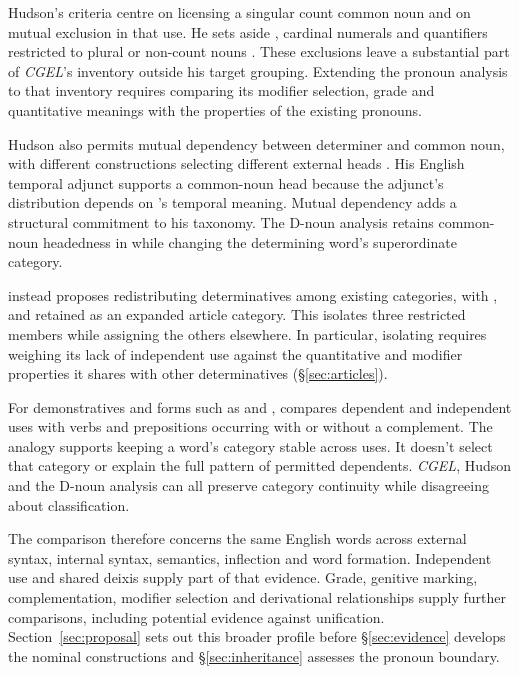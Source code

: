 \documentclass[12pt]{article}
\begin{document}
Hudson's criteria centre on licensing a singular count common noun and on mutual exclusion in that use. He sets aside , cardinal numerals and quantifiers restricted to plural or non-count nouns \citep[9--10]{hudson2004determiners}. These exclusions leave a substantial part of \textit{CGEL}'s inventory outside his target grouping. Extending the pronoun analysis to that inventory requires comparing its modifier selection, grade and quantitative meanings with the properties of the existing pronouns.

Hudson also permits mutual dependency between determiner and common noun, with different constructions selecting different external heads \citep[7--12]{hudson2004determiners}. His English temporal adjunct  supports a common-noun head because the adjunct's distribution depends on 's temporal meaning. Mutual dependency adds a structural commitment to his taxonomy. The D-noun analysis retains common-noun headedness in  while changing the determining word's superordinate category.

\textcite{spinillo2004reconceptualising} instead proposes redistributing determinatives among existing categories, with ,  and  retained as an expanded article category. This isolates three restricted members while assigning the others elsewhere. In particular, isolating  requires weighing its lack of independent use against the quantitative and modifier properties it shares with other determinatives (§\ref{sec:articles}).

For demonstratives and forms such as  and , \textcite[140--144]{spinillo2004reconceptualising} compares dependent and independent uses with verbs and prepositions occurring with or without a complement. The analogy supports keeping a word's category stable across uses. It doesn't select that category or explain the full pattern of permitted dependents. \textit{CGEL}, Hudson and the D-noun analysis can all preserve category continuity while disagreeing about classification.

The comparison therefore concerns the same English words across external syntax, internal syntax, semantics, inflection and word formation. Independent use and shared deixis supply part of that evidence. Grade, genitive marking, complementation, modifier selection and derivational relationships supply further comparisons, including potential evidence against unification. Section~\ref{sec:proposal} sets out this broader profile before §\ref{sec:evidence} develops the nominal constructions and §\ref{sec:inheritance} assesses the pronoun boundary.
\end{document}
